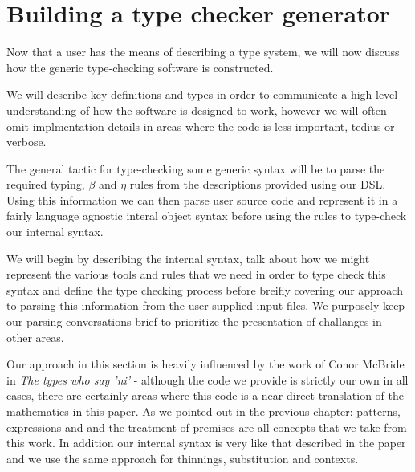 \chapter{Building a type checker generator}

Now that a user has the means of describing a type system, we will now
discuss how the generic type-checking software is constructed.

We will describe key definitions and types in order to communicate a
high level understanding of how the software is designed to work,
however we will often omit implmentation details in areas where the
code is less important, tedius or verbose.

The general tactic for type-checking some generic syntax will be to
parse the required typing, $\beta$ and $\eta$ rules from the
descriptions provided using our DSL. Using this information we can
then parse user source code and represent it in a fairly language
agnostic interal object syntax before using the rules to type-check
our internal syntax.

We will begin by describing the internal syntax, talk about how we
might represent the various tools and rules that we need in order to
type check this syntax and define the type checking process before
breifly covering our approach to parsing this information from the
user supplied input files. We purposely keep our parsing conversations
brief to prioritize the presentation of challanges in other areas.

Our approach in this section is heavily influenced by the work of
Conor McBride in \emph{The types who say 'ni'} \cite{TypesWhoSayNi} -
although the code we provide is strictly our own in all cases, there
are certainly areas where this code is a near direct translation of
the mathematics in this paper. As we pointed out in the previous
chapter: patterns, expressions and and the treatment of premises are
all concepts that we take from this work. In addition our internal
syntax is very like that described in the paper and we use the same
approach for thinnings, substitution and contexts.

\\\\
















